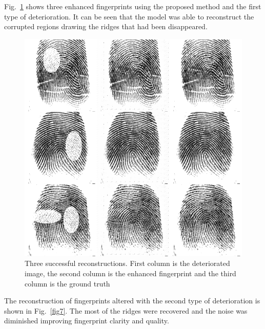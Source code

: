 \documentclass[a4paper,fleqn]{cas-dc}
\begin{document}
Fig.~\ref{fig6} shows three enhanced fingerprints using the proposed method and the first type of deterioration. It can be seen that the model was able to reconstruct the corrupted regions drawing the ridges that had been disappeared.

\begin{figure}[htbp]
\centerline{\includegraphics[scale=0.28]{figs/recons_1.png}}
\caption{Three successful reconstructions. First column is the deteriorated image, the second column is the enhanced fingerprint and the third column is the ground truth}
\label{fig6}
\end{figure}

The reconstruction of fingerprints altered with the second type of deterioration is shown in Fig.~\ref{fig7}. The most of the ridges were recovered and the noise was diminished improving fingerprint clarity and quality.
\end{document}
